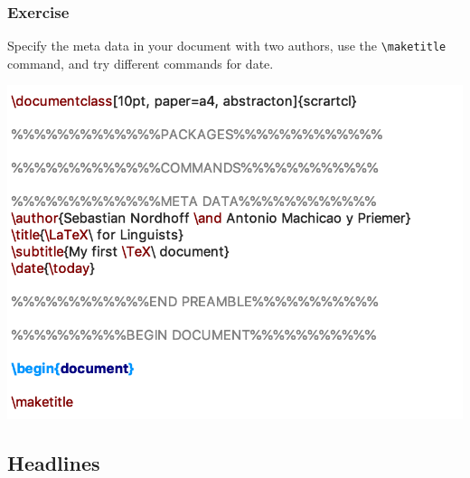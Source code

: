\begin{frame}[fragile]
\frametitle{Exercise}

Specify the meta data in your document with two authors, use the  \lstinline|\maketitle| command, and try different commands for date.

\centering
\includegraphics[width=0.65\linewidth]{../../texfiles-beamer/tex-material/WissArb-latex/xelatexTest3tex}

\end{frame}


\subsection{Headlines}

